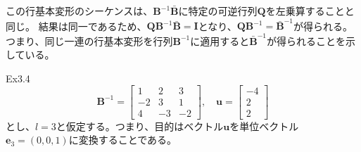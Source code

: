 \documentclass{jsarticle}
\begin{document}
この行基本変形のシーケンスは、$\bm{B}^{-1}\bar{\bm{B}}$に特定の可逆行列$\bm{Q}$を左乗算することと同じ。
結果は同一であるため、$\bm{Q}\bm{B}^{-1}\bar{\bm{B}}= \bm{I}$となり、$\bm{Q}\bm{B}^{-1}=\bar{\bm{B}}^{-1}$が得られる。
つまり、同じ一連の行基本変形を行列$\bm{B}^{-1}$に適用すると$\bar{\bm{B}}^{-1}$が得られることを示している。

Ex3.4\\
\begin{equation}
  \mathbf{B}^{-1}=\left[\begin{array}{rrr}
  1 & 2 & 3 \\
  -2 & 3 & 1 \\
  4 & -3 & -2
  \end{array}\right], \quad \mathbf{u}=\left[\begin{array}{r}
  -4 \\
  2 \\
  2
  \end{array}\right]
  \end{equation}
とし、$l=3$と仮定する。つまり、目的はベクトル$\bm{u}$を単位ベクトル$\bm{e}_3 =(0,0,1)$に変換することである。
\end{document}
